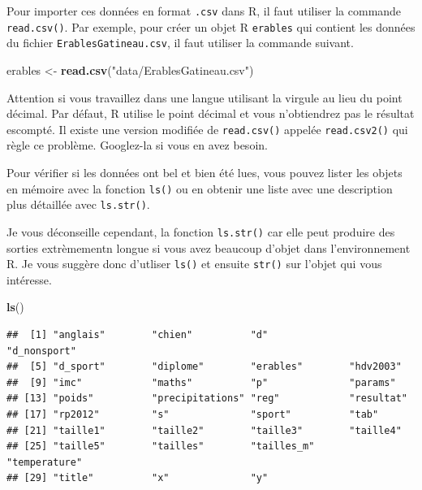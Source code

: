 \documentclass[
  12pt,
]{book}
\makeatletter
\newenvironment{Shaded}{\begin{snugshade}}{\end{snugshade}}
\newcommand{\KeywordTok}[1]{\textcolor[rgb]{0.13,0.29,0.53}{\textbf{#1}}}
\newcommand{\NormalTok}[1]{#1}
\newcommand{\StringTok}[1]{\textcolor[rgb]{0.31,0.60,0.02}{#1}}
\newenvironment{kframe}{%
\medskip{}
\setlength{\fboxsep}{.8em}
\def\at@end@of@kframe{}%
\ifinner\ifhmode%
 \def\at@end@of@kframe{\end{minipage}}%
 \begin{minipage}{\columnwidth}%
\fi\fi%
\def\FrameCommand##1{\hskip\@totalleftmargin \hskip-\fboxsep
\colorbox{incolor}{##1}\hskip-\fboxsep
    \hskip-\linewidth \hskip-\@totalleftmargin \hskip\columnwidth}%
\MakeFramed {\advance\hsize-\width
  \@totalleftmargin\z@ \linewidth\hsize
  \@setminipage}}%
{\par\unskip\endMakeFramed%
\at@end@of@kframe}
\newenvironment{rmdblock}[1]
 {
 \begin{itemize}
 \renewcommand{\labelitemi}{
   \raisebox{-.7\height}[0pt][0pt]{
     {\setkeys{Gin}{width=3em,keepaspectratio}\texttt{[image: images/\#1]}}
   }
 }
 \begin{kframe}
 \setlength{\fboxsep}{1em}
 \item
 }
 {
 \end{kframe}
 \end{itemize}
 }
\newenvironment{rmdtip}
  {\begin{rmdblock}{tip}}
  {\end{rmdblock}}
\newenvironment{rmdwarning}
  {\begin{rmdblock}{warning}}
  {\end{rmdblock}}
\makeatother
\begin{document}
Pour importer ces données en format \texttt{.csv} dans R, il faut utiliser la commande \texttt{read.csv()}.
Par exemple, pour créer un objet R \texttt{erables} qui contient les données du fichier \texttt{ErablesGatineau.csv}, il faut utiliser la commande suivant.

\begin{Shaded}
\begin{Highlighting}[]
\NormalTok{erables \textless{}{-}}\StringTok{ }\KeywordTok{read.csv}\NormalTok{(}\StringTok{"data/ErablesGatineau.csv"}\NormalTok{)}
\end{Highlighting}
\end{Shaded}

\begin{rmdwarning}
Attention si vous travaillez dans une langue utilisant la virgule au lieu du point décimal.
Par défaut, R utilise le point décimal et vous n'obtiendrez pas le résultat escompté.
Il existe une version modifiée de \texttt{read.csv()} appelée \texttt{read.csv2()} qui règle ce problème.
Googlez-la si vous en avez besoin.
\end{rmdwarning}

Pour vérifier si les données ont bel et bien été lues, vous pouvez lister les objets en mémoire avec la fonction \texttt{ls()} ou en obtenir une liste avec une description plus détaillée avec \texttt{ls.str()}.

\begin{rmdtip}
Je vous déconseille cependant, la fonction \texttt{ls.str()} car elle peut produire des sorties extrèmementn longue si vous avez beaucoup d'objet dans l'environnement R. Je vous suggère donc d'utliser \texttt{ls()} et ensuite \texttt{str()} sur l'objet qui vous intéresse.
\end{rmdtip}

\begin{Shaded}
\begin{Highlighting}[]
\KeywordTok{ls}\NormalTok{()}
\end{Highlighting}
\end{Shaded}

\begin{verbatim}
##  [1] "anglais"        "chien"          "d"              "d_nonsport"    
##  [5] "d_sport"        "diplome"        "erables"        "hdv2003"       
##  [9] "imc"            "maths"          "p"              "params"        
## [13] "poids"          "precipitations" "reg"            "resultat"      
## [17] "rp2012"         "s"              "sport"          "tab"           
## [21] "taille1"        "taille2"        "taille3"        "taille4"       
## [25] "taille5"        "tailles"        "tailles_m"      "temperature"   
## [29] "title"          "x"              "y"
\end{verbatim}
\end{document}
